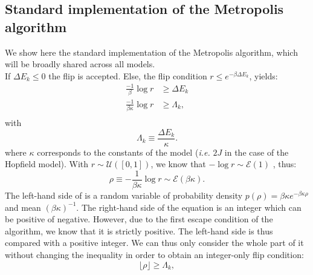\subsection{Standard implementation of the Metropolis algorithm}
We show here the standard implementation of the Metropolis algorithm, which will be broadly shared across all models.\\
If $\Delta E_k \leq 0$ the flip is accepted. Else, the flip condition $r \leq e^{-\beta \Delta E_k}$, yields:
\begin{equation}
\begin{aligned}
  \frac{-1}{\beta}\log r &\geq \Delta E_k\\
  \frac{-1}{\beta \kappa}\log r &\geq \Lambda_k,\\
\end{aligned}
\label{eq:flip_condition}
\end{equation}
with
\begin{equation}
  \Lambda_k \equiv \frac{\Delta E_k}{\kappa}.
  \label{eq:def_lambda}
\end{equation}
where  $\kappa$ corresponds to the constants of the model (\textit{i.e.} $2J$ in the case of the Hopfield model).
With $r \sim \mathcal{U}([0,1])$, we know that $-\log r \sim \mathcal{E}(1)$ , thus:
\begin{equation}
   \rho \equiv -\frac{1}{\beta \kappa}\log r  \sim \mathcal{E}(\beta \kappa).
\end{equation}
 The left-hand side of  is a random variable of probability density $p(\rho)=\beta  \kappa e^{-\beta  \kappa \rho}$ and mean $(\beta  \kappa)^{-1}$.
The right-hand side of the equation is an integer which can be positive of negative. However, due to the first escape condition of the algorithm, we know that it is strictly positive. The left-hand side is thus compared with a positive integer. We can thus only consider the whole part of it without changing the inequality in order to obtain an integer-only flip condition:
\begin{equation}
  \lfloor \rho \rfloor \geq \Lambda_k,
  \label{eq:flip_int}
\end{equation}

